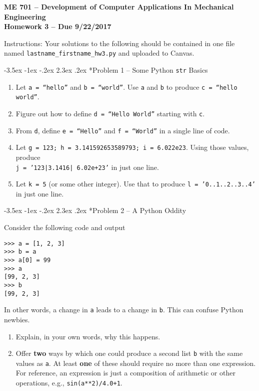 \documentclass[11pt]{article}
\makeatletter
\renewcommand\section{\@startsection{section}{1}{\z@}%
                                  {-3.5ex \@plus -1ex \@minus -.2ex}%
                                  {2.3ex \@plus.2ex}%
                                  {\normalfont\bfseries}}
\makeatother
\begin{document}
{\large
  \begin{center}
    {\bf ME 701 -- Development of Computer Applications In Mechanical Engineering \\ 
         Homework 3 -- Due 9/22/2017}         
  \end{center}
}
 
Instructions:  Your solutions to the following should be contained in
one file named {\tt lastname\_firstname\_hw3.py} and uploaded to Canvas.


\section*{Problem 1 -- Some Python \texttt{str} Basics}

\begin{enumerate}
\item Let \texttt{a = ``hello''} and \texttt{b = ``world''}.  Use 
      \texttt{a} and  \texttt{b} to produce \texttt{c = ``hello world''}.
\item Figure out how to define \texttt{d = ``Hello World''} starting with 
      \texttt{c}.
\item From \texttt{d}, define \texttt{e = ``Hello''} and  \texttt{f = ``World''}
      in a single line of code.
\item Let  \texttt{g = 123; h = 3.141592653589793; i = 6.022e23}.  Using those 
      values, produce \\ \texttt{j = '123|3.1416| 6.02e+23'} in just one line.
\item Let \texttt{k = 5} (or some other integer).  Use that to produce 
      \texttt{l =  '0..1..2..3..4'} in just one line.
\end{enumerate} 

\section*{Problem 2 -- A Python Oddity}

Consider the following code and output
\begin{verbatim}
>>> a = [1, 2, 3]
>>> b = a
>>> a[0] = 99
>>> a
[99, 2, 3]
>>> b
[99, 2, 3]
\end{verbatim}
In other words, a change in \texttt{a} leads to
a change in \texttt{b}.  This can confuse Python
newbies.  
\begin{enumerate}
 \item Explain, in your own words, why this happens.
 \item Offer {\bf two} ways by which one could 
       produce a second list \texttt{b} with the same 
       values as \texttt{a}.  At least {\bf one} of 
       these should require no more than one 
       expression.  For reference, an expression is 
       just a composition of arithmetic or other operations, e.g.,
       \texttt{sin(a**2)/4.0+1}.
\end{enumerate}
\end{document}
